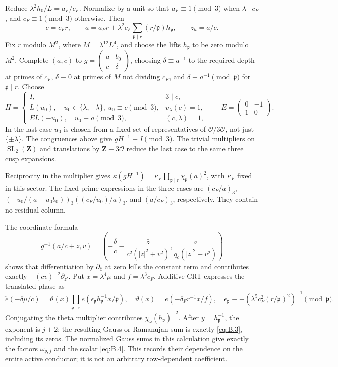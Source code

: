 \documentclass[11pt,a4paper]{article}
\begin{document}
Reduce \(\lambda^2h_0/L=a_F/c_F\). Normalize by a unit so that \(a_F\equiv1\pmod3\) when \(\lambda\mid c_F\), and \(c_F\equiv1\pmod3\) otherwise. Then \[
c=c_Fr,\qquad a=a_Fr+\lambda^2c_F\sum_{\mathfrak p\mid r}(r/\mathfrak p)h_{\mathfrak p},
\qquad z_h=a/c.
\] Fix \(r\) modulo \(M^2\), where \(M=\lambda^{12}L^4\), and choose the lifts \(h_{\mathfrak p}\) to be zero modulo \(M^2\). Complete \((a,c)\) to \(g=\left(\begin{smallmatrix}a&b_0\\c&\delta\end{smallmatrix}\right)\), choosing \(\delta\equiv a^{-1}\) to the required depth at primes of \(c_F\), \(\delta\equiv0\) at primes of \(M\) not dividing \(c_F\), and \(\delta\equiv a^{-1}\pmod{\mathfrak p}\) for \(\mathfrak p\mid r\). Choose \[
H=\begin{cases}
I,&3\mid c,\\
L(u_0),\quad u_0\in\{\lambda,-\lambda\},\ u_0\equiv c\pmod3,
&v_\lambda(c)=1,\\
EL(-u_0),\quad u_0\equiv a\pmod3,&(c,\lambda)=1,
\end{cases}
\qquad E=\begin{pmatrix}0&-1\\1&0\end{pmatrix}.
\] In the last case \(u_0\) is chosen from a fixed set of representatives of \(\mathcal O/3\mathcal O\), not just \(\{\pm\lambda\}\). The congruences above give \(gH^{-1}\equiv I\pmod3\). The trivial multipliers on \(\operatorname{SL}_2(\mathbf Z)\) and translations by \(\mathbf Z+3\mathcal O\) reduce the last case to the same three cusp expansions.

Reciprocity in the multiplier gives \(\kappa(gH^{-1})=\kappa_F\prod_{\mathfrak p\mid r}\chi_{\mathfrak p}(a)^2\), with \(\kappa_F\) fixed in this sector. The fixed-prime expressions in the three cases are \((c_F/a)_3\), \((-u_0/(a-u_0b_0))_3((c_F/u_0)/a)_3\), and \((a/c_F)_3\), respectively. They contain no residual column.

The coordinate formula \[
g^{-1}(a/c+z,v)=
\left(-\frac\delta c-\frac{\bar z}{c^2(|z|^2+v^2)},
\frac v{q_c(|z|^2+v^2)}\right)
\tag{B.10}\label{eq:B.10}
\] shows that differentiation by \(\partial_{\bar z}\) at zero kills the constant term and contributes exactly \(-(cv)^{-2}\partial_{z'}\). Put \(x=\lambda^4\mu\) and \(f=\lambda^3c_F\). Additive CRT expresses the translated phase as \[
\check e(-\delta\mu/c)=\vartheta(x)
\prod_{\mathfrak p\mid r}e(\epsilon_{\mathfrak p}h_{\mathfrak p}^{-1}x/\mathfrak p),
\quad \vartheta(x)=e(-\delta_Fr^{-1}x/f),
\quad\epsilon_{\mathfrak p}\equiv-(\lambda^5c_F^2(r/\mathfrak p)^2)^{-1}\pmod{\mathfrak p}.
\] Conjugating the theta multiplier contributes \(\chi_{\mathfrak p}(h_{\mathfrak p})^{-2}\). After \(y=h_{\mathfrak p}^{-1}\), the exponent is \(j+2\); the resulting Gauss or Ramanujan sum is exactly \eqref{eq:B.3}, including its zeros. The normalized Gauss sums in this calculation give exactly the factors \(\omega_{\mathfrak p,j}\) and the scalar \eqref{eq:B.4}. This records their dependence on the entire active conductor; it is not an arbitrary row-dependent coefficient.
\end{document}
